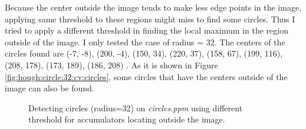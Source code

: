 \documentclass[paper=a4, fontsize=11pt]{scrartcl}
\begin{document}
Because the center outside the image tends to make less edge points in the image, applying same threshold to these regions might miss to find some circles. 
Thus I tried to apply a different threshold in finding the local maximum in the region outside of the image.
I only tested the case of radius = 32.
The centers of the circles found are (-7, -8), (200, -4), (150, 34), (220, 37), (158, 67), (199, 116), (208, 178), (173, 189), (186, 208) .
As it is shown in Figure \ref{fig:hough:circle:32:cv:circles}, some circles that have the centers outside of the image can also be found.

\begin{figure}[h]
\centering
{}
\caption{Detecting circles (radius=32) on \emph{circles.ppm} using different threshold for accumulators locating outside the image.}
\label{fig:hough:circle:32:cv}
\end{figure}
\end{document}
